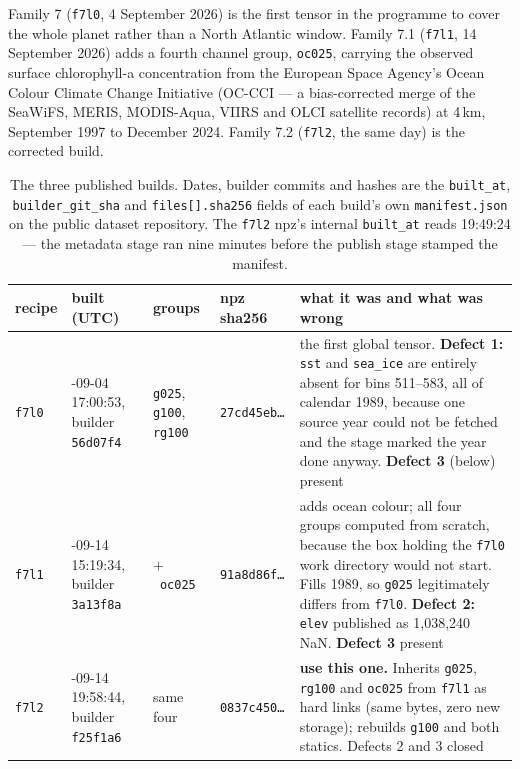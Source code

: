 \documentclass[10pt]{article}
\newcommand{\code}[1]{\texttt{#1}}
\begin{document}
Family 7 (\code{f7l0}, 4 September 2026) is the first tensor in the programme
to cover the whole planet rather than a North Atlantic window. Family 7.1
(\code{f7l1}, 14 September 2026) adds a fourth channel group, \code{oc025},
carrying the observed surface chlorophyll-a concentration from the European
Space Agency's Ocean Colour Climate Change Initiative (OC-CCI --- a
bias-corrected merge of the SeaWiFS, MERIS, MODIS-Aqua, VIIRS and OLCI
satellite records) at 4\,km, September 1997 to December 2024. Family 7.2
(\code{f7l2}, the same day) is the corrected build.

\begin{table}[h]
\centering\setlength{\tabcolsep}{4pt}\footnotesize
\begin{tabular}{@{}l>{\raggedright\arraybackslash}p{2.1cm}>{\raggedright\arraybackslash}p{3.4cm}>{\raggedright\arraybackslash}p{3.3cm}>{\raggedright\arraybackslash}p{4.4cm}@{}}
\toprule
recipe & built (UTC) & groups & npz sha256 & what it was and what was wrong \\
\midrule
\code{f7l0} & 2026-09-04 17:00:53, builder \code{56d07f4} &
\code{g025}, \code{g100}, \code{rg100} & \code{27cd45eb\dots} &
the first global tensor. \textbf{Defect 1:} \code{sst} and \code{sea\_ice}
are entirely absent for bins 511--583, all of calendar 1989, because one
source year could not be fetched and the stage marked the year done anyway.
\textbf{Defect 3} (below) present \\
\addlinespace
\code{f7l1} & 2026-09-14 15:19:34, builder \code{3a13f8a} &
\hbox{$+$ \code{oc025}} & \code{91a8d86f\dots} &
adds ocean colour; all four groups computed from scratch, because the box
holding the \code{f7l0} work directory would not start. Fills 1989, so
\code{g025} legitimately differs from \code{f7l0}. \textbf{Defect 2:}
\code{elev} published as 1,038,240 NaN. \textbf{Defect 3} present \\
\addlinespace
\code{f7l2} & 2026-09-14 19:58:44, builder \code{f25f1a6} &
same four & \code{0837c450\dots} &
\textbf{use this one.} Inherits \code{g025}, \code{rg100} and \code{oc025}
from \code{f7l1} as hard links (same bytes, zero new storage); rebuilds
\code{g100} and both statics. Defects 2 and 3 closed \\
\bottomrule
\end{tabular}
\caption{The three published builds. Dates, builder commits and hashes are the
\code{built\_at}, \code{builder\_git\_sha} and \code{files[].sha256} fields of
each build's own \code{manifest.json} on the public dataset repository. The
\code{f7l2} npz's internal \code{built\_at} reads 19:49:24 --- the metadata
stage ran nine minutes before the publish stage stamped the manifest.}
\end{table}
\end{document}
